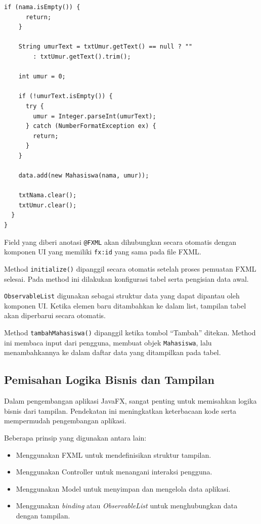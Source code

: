 \begin{lstlisting}[style=JavaStyle, caption=Controller dalam aplikasi JavaFX]
    if (nama.isEmpty()) {
      return;
    }

    String umurText = txtUmur.getText() == null ? ""
        : txtUmur.getText().trim();

    int umur = 0;

    if (!umurText.isEmpty()) {
      try {
        umur = Integer.parseInt(umurText);
      } catch (NumberFormatException ex) {
        return;
      }
    }

    data.add(new Mahasiswa(nama, umur));

    txtNama.clear();
    txtUmur.clear();
  }
}
\end{lstlisting}

Field yang diberi anotasi \texttt{@FXML} akan dihubungkan secara otomatis dengan komponen UI yang memiliki \texttt{fx:id} yang sama pada file FXML.

Method \texttt{initialize()} dipanggil secara otomatis setelah proses pemuatan FXML selesai. Pada method ini dilakukan konfigurasi tabel serta pengisian data awal.

\texttt{ObservableList} digunakan sebagai struktur data yang dapat dipantau oleh komponen UI. Ketika elemen baru ditambahkan ke dalam list, tampilan tabel akan diperbarui secara otomatis.

Method \texttt{tambahMahasiswa()} dipanggil ketika tombol ``Tambah'' ditekan. Method ini membaca input dari pengguna, membuat objek \texttt{Mahasiswa}, lalu menambahkannya ke dalam daftar data yang ditampilkan pada tabel.

\subsection{Pemisahan Logika Bisnis dan Tampilan}

Dalam pengembangan aplikasi JavaFX, sangat penting untuk memisahkan logika bisnis dari tampilan. Pendekatan ini meningkatkan keterbacaan kode serta mempermudah pengembangan aplikasi.

Beberapa prinsip yang digunakan antara lain:

\begin{itemize}
\item Menggunakan FXML untuk mendefinisikan struktur tampilan.
\item Menggunakan Controller untuk menangani interaksi pengguna.
\item Menggunakan Model untuk menyimpan dan mengelola data aplikasi.
\item Menggunakan \textit{binding} atau \textit{ObservableList} untuk menghubungkan data dengan tampilan.
\end{itemize}

